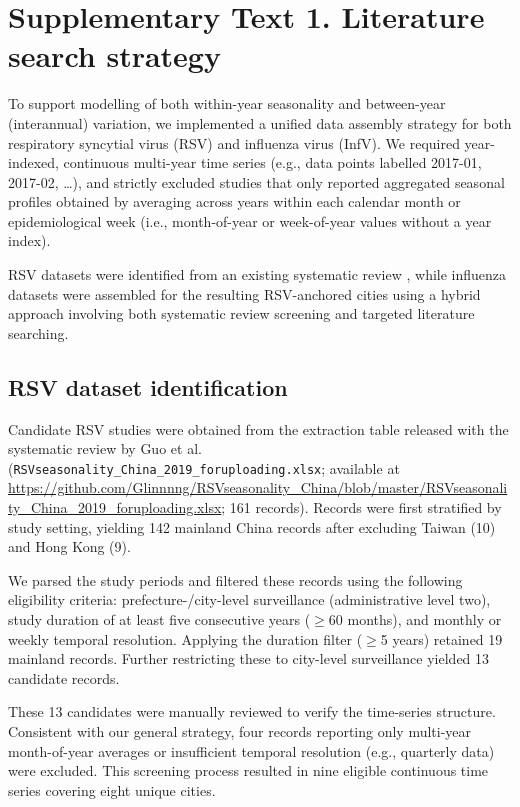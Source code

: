 \clearpage

\section*{Supplementary Text 1. Literature search strategy}

To support modelling of both within-year seasonality and between-year (interannual) variation, we implemented a unified data assembly strategy for both respiratory syncytial virus (RSV) and influenza virus (InfV). We required year-indexed, continuous multi-year time series (e.g., data points labelled 2017-01, 2017-02, \ldots), and strictly excluded studies that only reported aggregated seasonal profiles obtained by averaging across years within each calendar month or epidemiological week (i.e., month-of-year or week-of-year values without a year index).

RSV datasets were identified from an existing systematic review \cite{guo2024respiratory}, while influenza datasets were assembled for the resulting RSV-anchored cities using a hybrid approach involving both systematic review screening and targeted literature searching.

\subsection*{RSV dataset identification}

Candidate RSV studies were obtained from the extraction table released with the systematic review by Guo et al. \cite{guo2024respiratory} (\texttt{RSVseasonality\_China\_2019\_foruploading.xlsx}; available at \url{https://github.com/Glinnnng/RSVseasonality_China/blob/master/RSVseasonality_China_2019_foruploading.xlsx}; 161 records). Records were first stratified by study setting, yielding 142 mainland China records after excluding Taiwan (10) and Hong Kong (9).

We parsed the study periods and filtered these records using the following eligibility criteria: prefecture-/city-level surveillance (administrative level two), study duration of at least five consecutive years ($\geq$60 months), and monthly or weekly temporal resolution. Applying the duration filter ($\geq$5 years) retained 19 mainland records. Further restricting these to city-level surveillance yielded 13 candidate records.

These 13 candidates were manually reviewed to verify the time-series structure. Consistent with our general strategy, four records reporting only multi-year month-of-year averages or insufficient temporal resolution (e.g., quarterly data) were excluded. This screening process resulted in nine eligible continuous time series covering eight unique cities.

